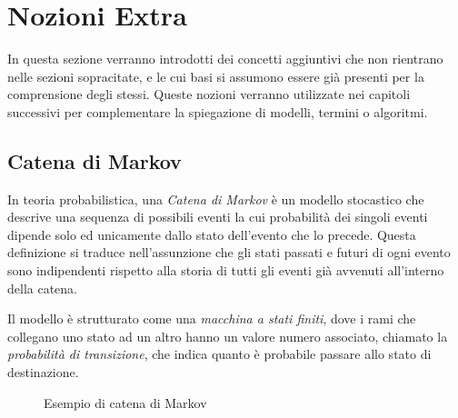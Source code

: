 \section{Nozioni Extra}
\label{chap:intro-extra}
In questa sezione verranno introdotti dei concetti aggiuntivi che non rientrano nelle sezioni sopracitate, e le cui basi si assumono essere già presenti per la comprensione degli stessi. Queste nozioni verranno utilizzate nei capitoli successivi per complementare la spiegazione di modelli, termini o algoritmi.

\subsection{Catena di Markov}
\label{chap:intro-extra-markov}
In teoria probabilistica, una \textit{Catena di Markov} è un modello stocastico che descrive una sequenza di possibili eventi la cui probabilità dei singoli eventi dipende solo ed unicamente dallo stato dell'evento che lo precede. Questa definizione si traduce nell'assunzione che gli stati passati e futuri di ogni evento sono indipendenti rispetto alla storia di tutti gli eventi già avvenuti all'interno della catena.

Il modello è strutturato come una \textit{macchina a stati finiti}, dove i rami che collegano uno stato ad un altro hanno un valore numero associato, chiamato la \textit{probabilità di transizione}, che indica quanto è probabile passare allo stato di destinazione.

\begin{figure}[h]
    \centering
     \caption{Esempio di catena di Markov}
    \label{fig:intro-markov-chain}
\end{figure}

